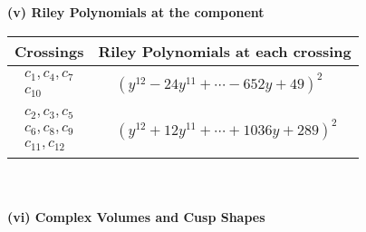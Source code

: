 \documentclass[1p]{elsarticle_modified}
\theoremstyle{definition}
\begin{document}
\newpage\renewcommand{\arraystretch}{1}
\flushleft \textbf{(v) Riley Polynomials at the component}\newline \\
\begin{tabular}{m{50pt}|m{274pt}}
Crossings & \hspace{64pt}Riley Polynomials at each crossing \\
\hline $$\begin{aligned}c_{1},c_{4},c_{7}\\c_{10}\end{aligned}$$&$\begin{aligned}
&(y^{12}-24 y^{11}+\cdots-652 y+49)^{2}
\end{aligned}$\\
\hline $$\begin{aligned}c_{2},c_{3},c_{5}\\c_{6},c_{8},c_{9}\\c_{11},c_{12}\end{aligned}$$&$\begin{aligned}
&(y^{12}+12 y^{11}+\cdots+1036 y+289)^{2}
\end{aligned}$\\
\hline
\end{tabular}\\~\\
\newpage\flushleft \textbf{(vi) Complex Volumes and Cusp Shapes}
\end{document}
